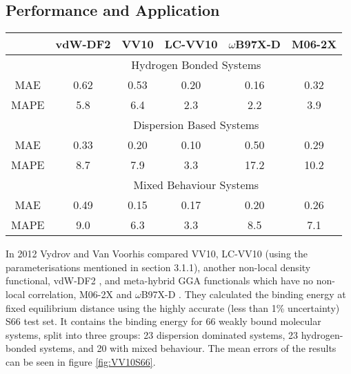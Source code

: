 \documentclass[10pt,a4paper,twocolumn,twoside]{extarticle}
\newcommand{\kcal}{kcal mol\(^{-1}\)}
\begin{document}
	\subsection{Performance and Application}
	\begin{figure*}
		\centering
		\begin{tabular}[]{c|c c c c c}
			& vdW-DF2 & VV10 & LC-VV10 & $\omega$B97X-D & M06-2X\\
			\hline
			& \multicolumn{5}{c}{Hydrogen Bonded Systems}\\
			MAE & 0.62 & 0.53 & 0.20 & 0.16 & 0.32\\
			MAPE & 5.8 & 6.4 & 2.3 & 2.2 & 3.9\\
			& \multicolumn{5}{c}{Dispersion Based Systems}\\
			MAE & 0.33 & 0.20 & 0.10 & 0.50 & 0.29\\
			MAPE & 8.7 & 7.9 & 3.3 & 17.2 & 10.2\\
			& \multicolumn{5}{c}{Mixed Behaviour Systems}\\
			MAE & 0.49 & 0.15 & 0.17 & 0.20 & 0.26\\
			MAPE & 9.0 & 6.3 & 3.3 & 8.5 & 7.1\\
		\end{tabular}
		\caption{Errors of the binding energy at equilibrium distance for the functionals benchmarked against the S66 test set for weakly bounded systems in Ref \cite{Vydrov2012}, where MAE is the mean absolute error in \kcal and MPE is the mean absolute percentage error. }
		\label{fig:VV10S66}
	\end{figure*}
		
	
	In 2012 Vydrov and Van Voorhis compared VV10, LC-VV10 (using the parameterisations mentioned in section 3.1.1), another non-local density functional, vdW-DF2 \cite{Lee2010-vdW-DF2-Original}, and meta-hybrid GGA functionals which have no non-local correlation, M06-2X \cite{M06-2X} and $\omega$B97X-D \cite{B97X-D}. They calculated the binding energy at fixed equilibrium distance using the highly accurate (less than 1\% uncertainty) S66\cite{s66a, s66b} test set. It contains the binding energy for 66 weakly bound molecular systems, split into three groups: 23 dispersion dominated systems, 23 hydrogen-bonded systems, and 20 with mixed behaviour. The mean errors of the results can be seen in figure \ref{fig:VV10S66}.
\end{document}
